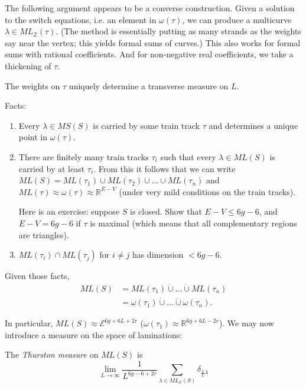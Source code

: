 The following argument appears to be a
converse construction.
Given a solution to the switch equations,
i.e. an element in $\omega(\tau)$, we can
produce
a multicurve $\lambda \in
ML_{\mathbb{Z}}(\tau)$.
(The method is essentially putting as many
strands
as the weights say near the vertex;
this yields formal sums of curves.)
This also works for formal sums with rational
coefficients.
And for non-negative real coefficients, we
take a thickening of $\tau$.

\begin{theorem}[Thurston]
\label{theorem-thurston-train-tracks}
The weights on $\tau$ uniquely determine a
transverse measure on $L$.
\end{theorem}

\medskip\noindent
Facts:
\begin{enumerate}
\item Every $\lambda \in MS(S)$
is carried by some train track $\tau$ and
determines
a unique point in $\omega(\tau)$.
\item There are finitely many train tracks
$\tau_i$ such that
every $\lambda \in ML(S)$ is carried by at
least $\tau_i$.
From this it follows that we can write
$ML(S)=ML(\tau_1)\cup  ML(\tau_2)\cup
\ldots\cup ML(\tau_n)$
and $ML(\tau)\approx \omega(\tau)\approx
\mathbb{R}^{E-V}$
(under very mild conditions on the train
tracks).

Here is an exercise: suppose $S$ is closed.
Show that $E-V \leq  6g-6$, and
$E-V=6g-6$ if $\tau$ is maximal (which means
that all complementary
regions are triangles).

\item $ML(\tau_i)\cap ML(\tau_j)$ for $i \neq
j$ has dimension
$<6g-6$.
\end{enumerate}

Given those facts,
$$
\begin{aligned}
ML(S)&=ML(\tau_1)\dot\cup \ldots \dot\cup
ML(\tau_n)\\
&=\omega(\tau_1)\dot\cup \ldots\dot\cup
\omega(\tau_n).
\end{aligned}
$$

\noindent
In particular, $ML(S)\approx
\mathcal{E}^{6g+6L+2r}$
($\omega(\tau_1)\approx\mathbb{R}^{6g+6L-2r}
$).
We may now introduce a measure on the space
of laminations:

\begin{definition}
\label{definition-thurston-measure}
The {\it Thurston measure} on $ML(S)$ is
$$
\lim_{L\to\infty}\frac{1}{L^{6g-6+2r}}
\sum_{\lambda
\in ML_{\mathbb{Z}}(S)}
\delta_{\frac{1}{L}\lambda}
$$
\end{definition}

